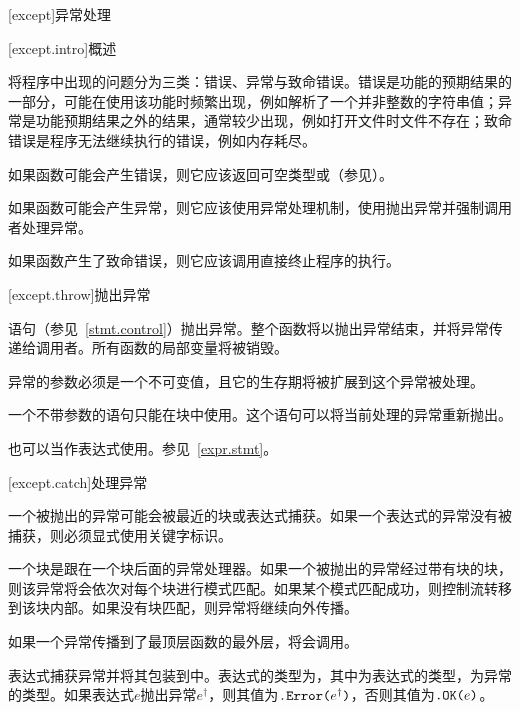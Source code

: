 
[except]{异常处理}

[except.intro]{概述}

\pnum
\X 将程序中出现的问题分为三类：错误、异常与致命错误。错误是功能的预期结果的一部分，可能在使用该功能时频繁出现，例如解析了一个并非整数的字符串值；异常是功能预期结果之外的结果，通常较少出现，例如打开文件时文件不存在；致命错误是程序无法继续执行的错误，例如内存耗尽。

\pnum
如果函数可能会产生错误，则它应该返回可空类型或（参见）。

\pnum
如果函数可能会产生异常，则它应该使用异常处理机制，使用抛出异常并强制调用者处理异常。

\pnum
如果函数产生了致命错误，则它应该调用直接终止程序的执行。

[except.throw]{抛出异常}

\pnum
{}语句（参见~\ref{stmt.control}）抛出异常。整个函数将以抛出异常结束，并将异常传递给调用者。所有函数的局部变量将被销毁。

\pnum
异常的参数必须是一个不可变值，且它的生存期将被扩展到这个异常被处理。

\pnum
一个不带参数的语句只能在块中使用。这个语句可以将当前处理的异常重新抛出。

\pnum
{}也可以当作表达式使用。参见~\ref{expr.stmt}。

[except.catch]{处理异常}

\pnum
一个被抛出的异常可能会被最近的块或表达式捕获。如果一个表达式的异常没有被捕获，则必须显式使用关键字标识。

\pnum
一个块是跟在一个块后面的异常处理器。如果一个被抛出的异常经过带有块的块，则该异常将会依次对每个块进行模式匹配。如果某个模式匹配成功，则控制流转移到该块内部。如果没有块匹配，则异常将继续向外传播。

\pnum
如果一个异常传播到了最顶层函数的最外层，将会调用。

\pnum
{}表达式捕获异常并将其包装到中。表达式的类型为，其中为表达式的类型，为异常的类型。如果表达式$e$抛出异常$e^\dagger$，则其值为$\texttt{.Error(}e^\dagger\texttt{)}$，否则其值为$\texttt{.OK(}e\texttt{)}$。

